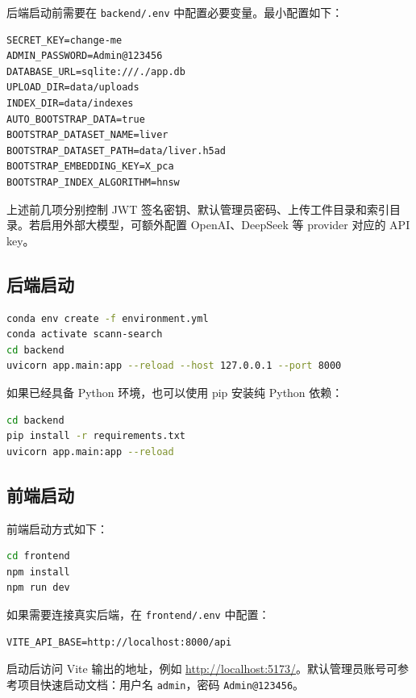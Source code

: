 \documentclass[UTF8,a4paper,12pt]{ctexrep}
\begin{document}
后端启动前需要在 \texttt{backend/.env} 中配置必要变量。最小配置如下：

\begin{lstlisting}[caption={后端 .env 最小配置}]
SECRET_KEY=change-me
ADMIN_PASSWORD=Admin@123456
DATABASE_URL=sqlite:///./app.db
UPLOAD_DIR=data/uploads
INDEX_DIR=data/indexes
AUTO_BOOTSTRAP_DATA=true
BOOTSTRAP_DATASET_NAME=liver
BOOTSTRAP_DATASET_PATH=data/liver.h5ad
BOOTSTRAP_EMBEDDING_KEY=X_pca
BOOTSTRAP_INDEX_ALGORITHM=hnsw
\end{lstlisting}

上述前几项分别控制 JWT 签名密钥、默认管理员密码、上传工件目录和索引目录。若启用外部大模型，可额外配置 OpenAI、DeepSeek 等 provider 对应的 API key。

\subsection{后端启动}

\begin{lstlisting}[language=bash,caption={后端启动}]
conda env create -f environment.yml
conda activate scann-search
cd backend
uvicorn app.main:app --reload --host 127.0.0.1 --port 8000
\end{lstlisting}

如果已经具备 Python 环境，也可以使用 pip 安装纯 Python 依赖：

\begin{lstlisting}[language=bash,caption={后端 pip 安装}]
cd backend
pip install -r requirements.txt
uvicorn app.main:app --reload
\end{lstlisting}

\subsection{前端启动}

前端启动方式如下：

\begin{lstlisting}[language=bash,caption={前端启动}]
cd frontend
npm install
npm run dev
\end{lstlisting}

如果需要连接真实后端，在 \texttt{frontend/.env} 中配置：

\begin{lstlisting}[caption={前端环境变量}]
VITE_API_BASE=http://localhost:8000/api
\end{lstlisting}

启动后访问 Vite 输出的地址，例如 \url{http://localhost:5173/}。默认管理员账号可参考项目快速启动文档：用户名 \texttt{admin}，密码 \texttt{Admin@123456}。
\end{document}
